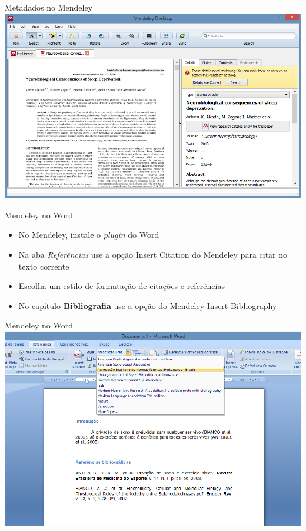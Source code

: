 \documentclass{beamer}
\begin{document}
\begin{frame}{Metadados no Mendeley}
  \includegraphics[width=\textwidth]{Referencias/mendeley-busca2}
\end{frame}

\begin{frame}{Mendeley no Word}
  \begin{itemize}
  \item No Mendeley, instale o {\em plugin} do Word
  \item Na aba {\em Referências} use a opção \alert{Insert Citation}
    do Mendeley para citar no texto corrente
  \item Escolha um estilo de formatação de citações e referências
  \item No capítulo {\bf Bibliografia} use a opção do Mendeley
    \alert{Insert Bibliography}
  \end{itemize}
\end{frame}

\begin{frame}{Mendeley no Word}
  \includegraphics[width=1.1\textwidth]{Referencias/mendeley-word-ABNT}
\end{frame}
\end{document}
